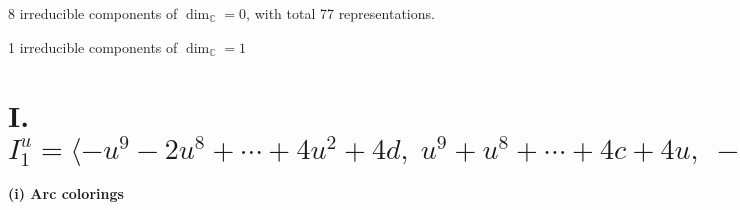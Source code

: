 \documentclass[1p]{elsarticle_modified}
\theoremstyle{definition}
\begin{document}
\raggedright * 8 irreducible components of $\dim_{\mathbb{C}}=0$, with total 77 representations.\\
\raggedright * 1 irreducible components of $\dim_{\mathbb{C}}=1$ \\
\newpage
\renewcommand{\arraystretch}{1}
\centering \section*{I. $I^u_{1}= \langle - u^9-2 u^8+\cdots+4 u^2+4 d,\;u^9+u^8+\cdots+4 c+4 u,\;- u^9-2 u^8+\cdots+4 u^2+4 b,\;u^9+u^8+\cdots+4 a+4 u,\;u^{11}+u^{10}+\cdots+4 u+4 \rangle$}
\flushleft \textbf{(i) Arc colorings}\\
\end{document}

